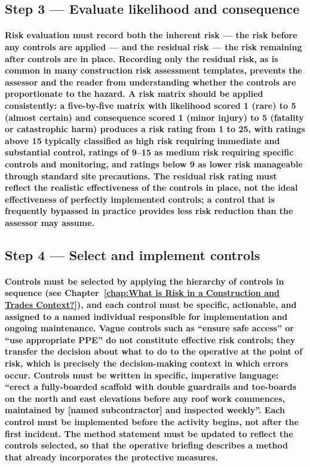 \subsection{Step 3 --- Evaluate likelihood and consequence}
\paragraph{Risk evaluation must record both the inherent risk --- the risk before any controls are applied --- and the residual risk --- the risk remaining after controls are in place. Recording only the residual risk, as is common in many construction risk assessment templates, prevents the assessor and the reader from understanding whether the controls are proportionate to the hazard. A risk matrix should be applied consistently: a five-by-five matrix with likelihood scored 1 (rare) to 5 (almost certain) and consequence scored 1 (minor injury) to 5 (fatality or catastrophic harm) produces a risk rating from 1 to 25, with ratings above 15 typically classified as high risk requiring immediate and substantial control, ratings of 9--15 as medium risk requiring specific controls and monitoring, and ratings below 9 as lower risk manageable through standard site precautions. The residual risk rating must reflect the realistic effectiveness of the controls in place, not the ideal effectiveness of perfectly implemented controls; a control that is frequently bypassed in practice provides less risk reduction than the assessor may assume.}

\subsection{Step 4 --- Select and implement controls}
\paragraph{Controls must be selected by applying the hierarchy of controls in sequence (see Chapter~\ref{chap:What is Risk in a Construction and Trades Context?}), and each control must be specific, actionable, and assigned to a named individual responsible for implementation and ongoing maintenance. Vague controls such as ``ensure safe access'' or ``use appropriate PPE'' do not constitute effective risk controls; they transfer the decision about what to do to the operative at the point of risk, which is precisely the decision-making context in which errors occur. Controls must be written in specific, imperative language: ``erect a fully-boarded scaffold with double guardrails and toe-boards on the north and east elevations before any roof work commences, maintained by [named subcontractor] and inspected weekly''. Each control must be implemented before the activity begins, not after the first incident. The method statement must be updated to reflect the controls selected, so that the operative briefing describes a method that already incorporates the protective measures.}

